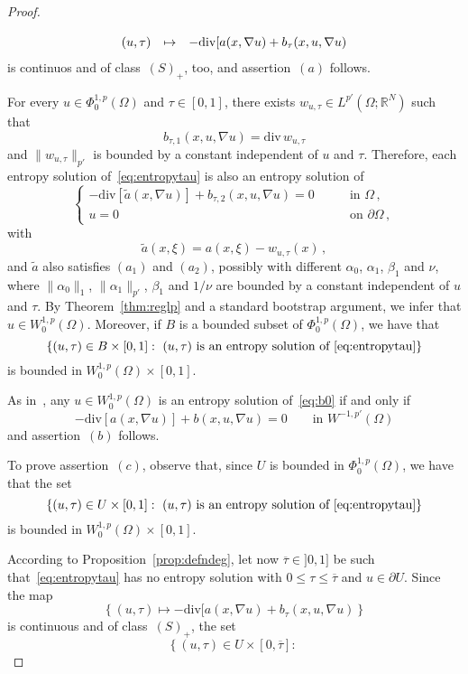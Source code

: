 \documentclass[twoside,reqno]{amsart}
\numberwithin{equation}{section}
\theoremstyle{definition}
\newcommand{\R}{\mathbb{R}}
\begin{document}
\begin{proof}
\[\begin{array}{ccc}
\noalign{\medskip}
(u,\tau) & \mapsto & 
-\mathrm{div}[a(x,\nabla u)+b_\tau(x,u,\nabla u)
\end{array}
\]
is continuos and of class~$(S)_+$, too, and assertion~$(a)$ 
follows.
\par
For every $u\in \Phi^{1,p}_0(\Omega)$ and $\tau\in[0,1]$, 
there exists $w_{u,\tau}\in L^{p'}(\Omega;\R^N)$ such that 
\[
b_{\tau,1}(x,u,\nabla u) = \mathrm{div}\,w_{u,\tau}
\]
and $\|w_{u,\tau}\|_{p'}$ is bounded by a constant independent
of $u$ and $\tau$.
Therefore, each entropy solution of~\eqref{eq:entropytau}
is also an entropy solution of 
\[
\begin{cases}
- \mathrm{div}[\tilde{a}(x,\nabla u)] + b_{\tau,2}(x,u,\nabla u)=0 
&\qquad\text{in $\Omega$}\,,\\
u=0
&\qquad\text{on $\partial\Omega$}\,,
\end{cases}
\]
with
\[
\tilde{a}(x,\xi) = a(x,\xi) - w_{u,\tau}(x)  \,,
\]
and $\tilde{a}$ also satisfies $(a_1)$ and $(a_2)$, possibly
with different $\alpha_0$, $\alpha_1$, $\beta_1$ and $\nu$,
where $\|\alpha_0\|_1$, $\|\alpha_1\|_{p'}$, $\beta_1$ and 
$1/\nu$ are bounded by a constant independent of $u$ and $\tau$.
By Theorem~\ref{thm:reglp} and a standard bootstrap argument,
we infer that $u\in W^{1,p}_0(\Omega)$.
Moreover, if $B$ is a bounded subset of $\Phi^{1,p}_0(\Omega)$,
we have that
\[
\left\{(u,\tau)\in B\times[0,1]:\,\,
\text{$(u,\tau)$ is an entropy solution 
of~\eqref{eq:entropytau}}\right\}
\]
is bounded in $W^{1,p}_0(\Omega)\times[0,1]$.
\par
As
in~\cite{benilan_boccardo_gallouet_gariepy_pierre_vazquez1995},
any $u\in W^{1,p}_0(\Omega)$
is an entropy solution of~\eqref{eq:b0} if and only if
\[
- \mathrm{div}[a(x,\nabla u)] + b(x,u,\nabla u)=0
\qquad\text{in $W^{-1,p'}(\Omega)$}
\]
and assertion~$(b)$ follows.
\par
To prove assertion~$(c)$, observe that,
since $U$ is bounded in $\Phi^{1,p}_0(\Omega)$, we have 
that the set
\[
\left\{(u,\tau)\in U\times[0,1]:\,\,
\text{$(u,\tau)$ is an entropy solution 
of~\eqref{eq:entropytau}}\right\}
\]
is bounded in $W^{1,p}_0(\Omega)\times[0,1]$.
\par
According to Proposition~\ref{prop:defndeg}, 
let now $\overline{\tau}\in]0,1]$ be such 
that~\eqref{eq:entropytau} has no entropy solution 
with $0\leq \tau \leq\overline{\tau}$ and $u\in\partial U$.
Since the map
\[
\left\{(u,\tau)\mapsto 
-\mathrm{div}[a(x,\nabla u)+b_\tau(x,u,\nabla u)\right\}
\]
is continuous and of class~$(S)_+$, the set
\[
\left\{(u,\tau)\in U\times[0,\overline{\tau}]:\,\,
\]
\end{proof}
\end{document}
